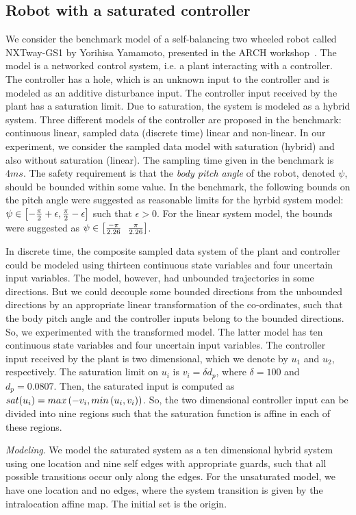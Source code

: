 \subsection{Robot with a saturated controller}   We consider the benchmark
model of a self-balancing two wheeled robot called NXTway-GS1 by
Yorihisa Yamamoto, presented in the ARCH workshop~\cite{TODO}.  The
model is a networked control system, i.e. a plant interacting with a
controller.  The controller has a hole, which is an unknown input to
the controller and is modeled as an additive disturbance input.  The
controller input received by the plant has a saturation limit.  Due to
saturation, the system is modeled as a hybrid system.  Three different
models of the controller are proposed in the benchmark: continuous
linear, sampled data (discrete time) linear and non-linear.  In our
experiment, we consider the sampled data model with saturation
(hybrid) and also without saturation (linear).  The sampling time given in
the benchmark is $4 ms$.  The safety requirement is that the
\emph{body pitch angle} of the robot, denoted $\psi$, should be
bounded within some value. In the benchmark, the following bounds on
the pitch angle were
suggested as reasonable limits for the hyrbid system model:
$\psi\in\left[-\frac{\pi}{2}+\epsilon,\frac{\pi}{2}-\epsilon\right]$ such
that $\epsilon>0$.  For the linear system model, the bounds were
suggested as $\psi\in\left[\frac{-\pi}{2.26}~~\frac{\pi}{2.26}\right]$.

In discrete time, the composite sampled data system of the plant and
controller could be modeled using thirteen continuous state variables
and four uncertain input variables.  The model, however, had unbounded
trajectories in some directions.  But we could decouple some bounded
directions from the unbounded directions by an appropriate linear
transformation of the co-ordinates, such that the body pitch angle and
the controller inputs belong to the bounded directions.  So, we
experimented with the transformed model.  The latter model has ten
continuous state variables and four uncertain input variables. The
controller input received by the plant is two dimensional, which we
denote by $u_1$ and $u_2$, respectively.  The saturation limit on
$u_i$ is $v_i=\delta d_p$, where $\delta=100$ and $d_p=0.0807$.  Then,
the saturated input is computed as $sat(u_i) =
max\left(-v_i,min\left(u_i,v_i\right)\right)$.  So, the two dimensional
controller input can be divided into nine regions such that the
saturation function is affine in each of these regions.

\emph{Modeling}.  We model the saturated system as a ten dimensional
hybrid system using one location and nine self edges with appropriate
guards, such that all possible transitions occur only along the edges.
For the unsaturated model, we have one location and no edges, where
the system transition is given by the intralocation affine map.  The
initial set is the origin.

